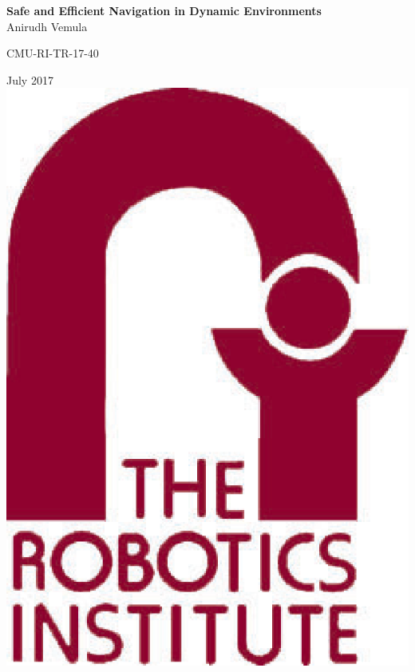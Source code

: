 \thispagestyle{empty}
\date{}

\begin{center}

{\Huge \bf Safe and Efficient Navigation in Dynamic Environments} \\
\vspace{1cm}  
{\Large Anirudh Vemula} \\
\vspace{1cm} 

\vspace{-0.5cm}
{\large CMU-RI-TR-17-40}
\vspace{2cm}

{\Large July 2017} \\
\vspace{0.5cm}
{\includegraphics[scale=0.3]{Figures/logo.eps}} \\

\end{center}
